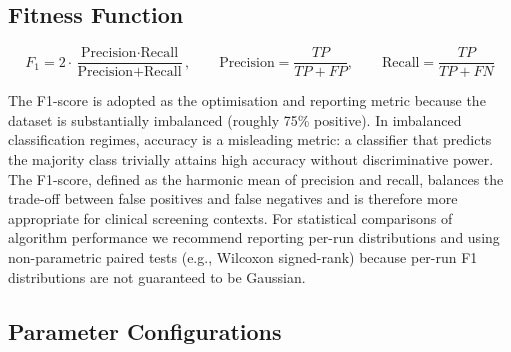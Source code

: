 \documentclass[12pt, a4paper]{article}
\begin{document}
\subsection{Fitness Function}

\begin{infobox}[title=Fitness Function: F1-Score]
\[
F_1 = 2 \cdot \frac{\text{Precision} \cdot \text{Recall}}{\text{Precision} + \text{Recall}}, \qquad
\text{Precision} = \frac{TP}{TP+FP}, \qquad
\text{Recall} = \frac{TP}{TP+FN}
\]
\end{infobox}

\vspace{4pt}
The F1-score is adopted as the optimisation and reporting metric because the dataset is substantially imbalanced (roughly 75\% positive). In imbalanced classification regimes, accuracy is a misleading metric: a classifier that predicts the majority class trivially attains high accuracy without discriminative power. The F1-score, defined as the harmonic mean of precision and recall, balances the trade-off between false positives and false negatives and is therefore more appropriate for clinical screening contexts. For statistical comparisons of algorithm performance we recommend reporting per-run distributions and using non-parametric paired tests (e.g., Wilcoxon signed-rank) because per-run F1 distributions are not guaranteed to be Gaussian.

\subsection{Parameter Configurations}
\end{document}
